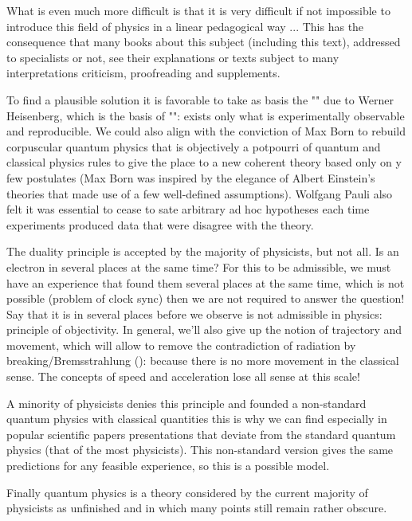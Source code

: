 	What is even much more difficult is that it is very difficult if not impossible to introduce this field of physics in a linear pedagogical way ... This has the consequence that many books about this subject (including this text), addressed to specialists or not, see their explanations or texts subject to many interpretations criticism, proofreading and supplements.
	
	To find a plausible solution it is favorable to take as basis the "" due to Werner Heisenberg, which is the basis of "": exists only what is experimentally observable and reproducible. We could also align with the conviction of Max Born to rebuild corpuscular quantum physics that is objectively a potpourri of quantum and classical physics rules to give the place to a new coherent theory based only on y few postulates (Max Born was inspired by the elegance of Albert Einstein's theories that made use of a few well-defined assumptions). Wolfgang Pauli also felt it was essential to cease to sate arbitrary ad hoc hypotheses each time experiments produced data that were disagree with the theory.
	
	The duality principle is accepted by the majority of physicists, but not all. Is an electron in several places at the same time? For this to be admissible, we must have an experience that found them several places at the same time, which is not possible (problem of clock sync) then we are not required to answer the question! Say that it is in several places before we observe is not admissible in physics: principle of objectivity. In general, we'll also give up the notion of trajectory and movement, which will allow to remove the contradiction of radiation by breaking/Bremsstrahlung (): because there is no more movement in the classical sense. The concepts of speed and acceleration lose all sense at this scale!
	
	A minority of physicists denies this principle and founded a non-standard quantum physics with classical quantities this is why we can find especially in popular scientific papers presentations that deviate from the standard quantum physics (that of the most physicists). This non-standard version gives the same predictions for any feasible experience, so this is a possible model.
	
	Finally quantum physics is a theory considered by the current majority of physicists as unfinished and in which many points still remain rather obscure.
	
